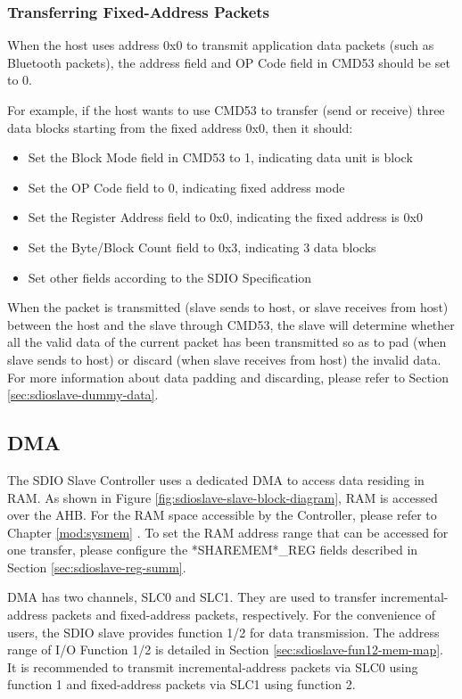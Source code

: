 \documentclass[main\_\_EN.tex]{subfiles}
\begin{document}
\subsubsection{Transferring Fixed-Address Packets}

When the host uses address 0x0 to transmit application data packets (such as Bluetooth packets), the address field and OP Code field in CMD53 should be set to 0.

For example, if the host wants to use CMD53 to transfer (send or receive) three data blocks starting from the fixed address 0x0, then it should:
\begin{itemize}
    \item Set the Block Mode field in CMD53 to 1, indicating data unit is block
    \item Set the OP Code field to 0, indicating fixed address mode
    \item Set the Register Address field to 0x0, indicating the fixed address is 0x0
    \item Set the Byte/Block Count field to 0x3, indicating 3 data blocks
    \item Set other fields according to the SDIO Specification
\end{itemize}

When the packet is transmitted (slave sends to host, or slave receives from host) between the host and the slave through CMD53, the slave will determine whether all the valid data of the current packet has been transmitted so as to pad (when slave sends to host) or discard (when slave receives from host) the invalid data. For more information about data padding and discarding, please refer to Section \ref{sec:sdioslave-dummy-data}.

\subsection{DMA}
\label{sec:sdioslave-dma}

The SDIO Slave Controller uses a dedicated DMA to access data residing in RAM. As shown in Figure \ref{fig:sdioslave-slave-block-diagram}, RAM is accessed over the AHB. For the RAM space accessible by the Controller, please refer to Chapter \ref{mod:sysmem} \textit{}. To set the RAM address range that can be accessed for one transfer, please configure the *SHAREMEM*\_REG fields described in Section \ref{sec:sdioslave-reg-summ}.

DMA has two channels, SLC0 and SLC1. They are used to transfer incremental-address packets and fixed-address packets, respectively. For the convenience of users, the SDIO slave provides function 1/2 for data transmission. The address range of I/O Function 1/2 is detailed in Section \ref{sec:sdioslave-fun12-mem-map}. It is recommended to transmit incremental-address packets via SLC0 using function 1 and fixed-address packets via SLC1 using function 2.
\end{document}
